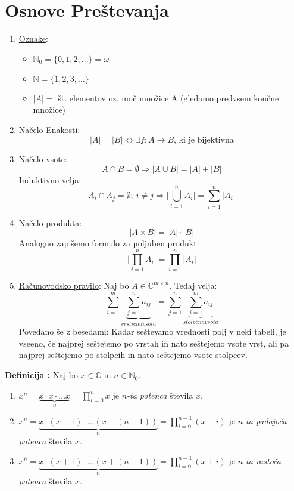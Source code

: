 \documentclass[a4paper, 10pt]{article}
\newcounter{defcount}
\newenvironment{definicija}{\begin{flushleft}\stepcounter{defcount}\textbf{Definicija \arabic{defcount}:}}{\hfill\end{flushleft}}
\newcommand{\abs}[1]{\ensuremath{\lvert #1 \rvert}}
\newcommand{\mth}[1]{\ensuremath{\mathbb{#1}}}
\newcommand{\pojem}[1]{\emph{#1}}
\begin{document}
\section{Osnove Preštevanja}
\begin{enumerate}

\item \underline{Oznake}:
\begin{itemize}

\item $\mth{N}_0 = \{0, 1, 2, \ldots \} = \omega$
\item $\mth{N} = \{1, 2, 3, \ldots \}$
\item $\abs{A} =$ št. elementov oz. moč množice A (gledamo predvsem končne množice) 

\end{itemize}

\item \underline{Načelo Enakosti}:
\[
\abs{A} = \abs{B} \iff \exists f : A \rightarrow B \text{, ki je bijektivna}
\]
\item \underline{Načelo vsote}:
\[
A \cap B = \emptyset \Rightarrow \abs{A \cup B} = \abs{A} + \abs{B}
\]
Induktivno velja:
\[
A_i \cap A_j = \emptyset; ~i\neq j \Rightarrow \abs{\bigcup^n_{i = 1}{A_i}} = \sum^n_{i = 1}{\abs{A_i}}
\]
\item \underline{Načelo produkta}:
\[
\abs{A\times B} = \abs{A} \cdot \abs{B}
\]
Analogno zapišemo formulo za poljuben produkt:
\[
\abs{\prod^n_{i = 1}{A_i}} = \prod^n_{i = 1}{\abs{A_i}}
\]
\item \underline{Računovodsko pravilo}:
Naj bo $A\in \mth{C}^{m \times n}$. Tedaj velja:
\[ \sum^m_{i = 1}{\underbrace{\sum^n_{j = 1}{a_{ij}}}_{vrstična vsota}} = \sum^n_{j = 1}{\underbrace{\sum^m_{i = 1}{a_{ij}}}_{stolpčna vsota}} \]
Povedano še z besedami: Kadar seštevamo vrednosti polj v neki tabeli, je vseeno, če najprej seštejemo po vrstah in nato seštejemo vsote vrst, ali pa najprej seštejemo po stolpcih in nato seštejemo vsote stolpcev.
\end{enumerate}

\begin{definicija}
Naj bo $x \in \mth{C}$ in $n\in \mth{N}_0$.
\begin{enumerate}

\item $x^n = \underbrace{x\cdot x\cdot\ldots x}_{n} = \prod^{n}_{i = 0}{x}$ je \pojem{$n$-ta potenca} števila $x$.
\item $x^{\underline{n}} = \underbrace{x\cdot (x - 1)\cdot\ldots (x - (n - 1))}_{n} = \prod^{n - 1}_{i = 0}{(x - i)}$ je \pojem{$n$-ta padajoča potenca} števila $x$.
\item $x^{\bar{n}} = \underbrace{x\cdot (x + 1)\cdot\ldots (x + (n - 1))}_{n} = \prod^{n - 1}_{i = 0}{(x + i)}$ je \pojem{$n$-ta rastoča potenca} števila $x$.

\end{enumerate}

\end{definicija}
\end{document}
